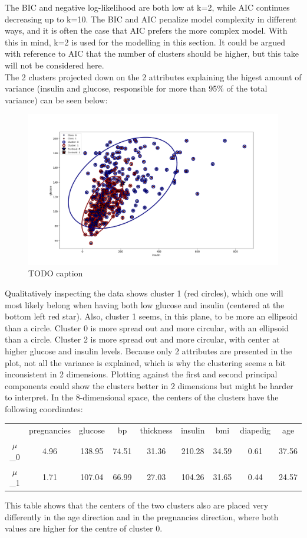 The BIC and negative log-likelihood are both low at k=2, while AIC continues
decreasing up to k=10. The BIC and AIC penalize model complexity in different ways,
and it is often the case that AIC prefers the more complex model. With this in mind,
k=2 is used for the modelling in this section. It could be argued with reference to AIC
that the number of clusters should be higher, but this take will not be considered here.\\
The 2 clusters projected down on the 2 attributes explaining the higest amount
of variance (insulin and glucose, responsible for more than 95\% of the total
variance) can be seen below:\\
\begin{figure}[htb]
  \centering
  \includegraphics[width=\textwidth]{Figure_2.png}
  \caption{TODO caption}
\end{figure}
Qualitatively inspecting the data shows cluster 1 (red circles), which one
will most likely belong when having both low glucose and insulin (centered
at the bottom left red star). Also, cluster 1 seems, in this plane, to be more
an ellipsoid than a circle. Cluster 0 is more spread out and more circular, with
an ellipsoid than a circle. Cluster 2 is more spread out and more circular, with
center at higher glucose and insulin levels.
Because only 2 attributes are presented in the plot, not all the variance is
explained, which is why the clustering seems a bit inconsistent in 2 dimensions.
Plotting against the first and second principal components could show the clusters better
in 2 dimensions but might be harder to interpret. In the 8-dimensional space, the centers
of the clusters have the following coordinates:\\
\begin{table}[h]
\centering
\begin{tabular}{ccccccccc}
    & pregnancies & glucose & bp & thickness & insulin & bmi & diapedig & age\\
$\mu$_0 & 4.96 & 138.95 & 74.51 & 31.36 & 210.28 & 34.59 & 0.61 & 37.56 \\
$\mu$_1 & 1.71 & 107.04 & 66.99 & 27.03 & 104.26 & 31.65 & 0.44 & 24.57 \\
\end{tabular}
\end{table}
This table shows that the centers of the two clusters also are placed very differently
in the age direction and in the pregnancies direction, where both values are
higher for the centre of cluster 0.

